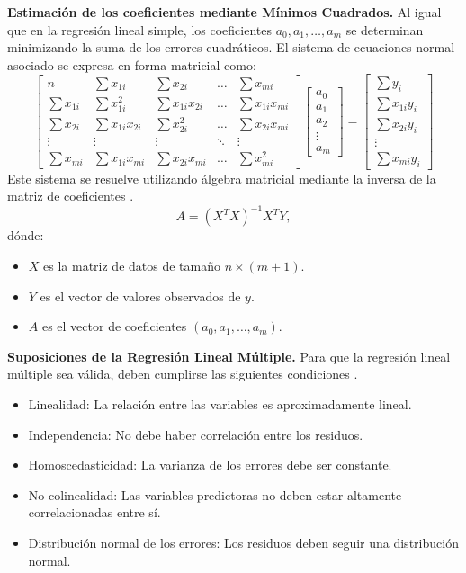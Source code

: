 \documentclass{article}
\begin{document}
\noindent \textbf{Estimación de los coeficientes mediante Mínimos Cuadrados.} Al igual que en la regresión lineal simple, los coeficientes $a_0, a_1, \dots, a_m$ se determinan minimizando la suma de los errores cuadráticos. El sistema de ecuaciones normal asociado se expresa en forma matricial como:
\[
\begin{bmatrix}
    n & \sum x_{1i} & \sum x_{2i} & \dots & \sum x_{mi} \\
    \sum x_{1i} & \sum x_{1i}^2 & \sum x_{1i} x_{2i} & \dots & \sum x_{1i} x_{mi} \\
    \sum x_{2i} & \sum x_{1i} x_{2i} & \sum x_{2i}^2 & \dots & \sum x_{2i} x_{mi} \\
    \vdots & \vdots & \vdots & \ddots & \vdots \\
    \sum x_{mi} & \sum x_{1i} x_{mi} & \sum x_{2i} x_{mi} & \dots & \sum x_{mi}^2
\end{bmatrix}
\begin{bmatrix}
    a_0 \\ a_1 \\ a_2 \\ \vdots \\ a_m
\end{bmatrix}
=
\begin{bmatrix}
    \sum y_i \\ \sum x_{1i} y_i \\ \sum x_{2i} y_i \\ \vdots \\ \sum x_{mi} y_i
\end{bmatrix}
\]
Este sistema se resuelve utilizando álgebra matricial mediante la inversa de la matriz de coeficientes \cite{polinomico5}.
\begin{equation}
    A = (X^T X)^{-1} X^T Y,
\end{equation}
dónde:
\begin{itemize}
    \item $X$ es la matriz de datos de tamaño $n \times (m+1)$.
    \item $Y$ es el vector de valores observados de $y$.
    \item $A$ es el vector de coeficientes $(a_0, a_1, \dots, a_m)$.
\end{itemize}

\noindent \textbf{Suposiciones de la Regresión Lineal Múltiple.} Para que la regresión lineal múltiple sea válida, deben cumplirse las siguientes condiciones \cite{polinomico2}.

\begin{itemize}
    \item Linealidad: La relación entre las variables es aproximadamente lineal.
    \item Independencia: No debe haber correlación entre los residuos.
    \item Homoscedasticidad: La varianza de los errores debe ser constante.
    \item No colinealidad: Las variables predictoras no deben estar altamente correlacionadas entre sí.
    \item Distribución normal de los errores: Los residuos deben seguir una distribución normal.
\end{itemize}
\end{document}
